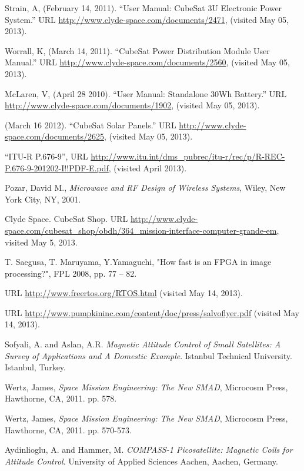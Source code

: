 \documentclass[12pt]{article}
\begin{document}
\begin{thebibliography}{9}
 Strain, A, (February 14, 2011).  ``User Manual: CubeSat 3U Electronic Power System.'' URL \url{http://www.clyde-space.com/documents/2471}, (visited May 05, 2013).

 Worrall, K, (March 14, 2011).  ``CubeSat Power Distribution Module User Manual.'' URL \url{http://www.clyde-space.com/documents/2560}, (visited May 05, 2013).

 McLaren, V, (April 28 2010).  ``User Manual: Standalone 30Wh Battery.''  URL \url{http://www.clyde-space.com/documents/1902}, (visited May 05, 2013).

 (March 16 2012). ``CubeSat Solar Panels.''  URL \url{http://www.clyde-space.com/documents/2625}, (visited May 05, 2013).


``ITU-R P.676-9'', URL \url{http://www.itu.int/dms_pubrec/itu-r/rec/p/R-REC-P.676-9-201202-I!!PDF-E.pdf}, (visited April 2013).

Pozar, David M., \emph{Microwave and RF Design of Wireless Systems}, Wiley, New York City, NY, 2001.



Clyde Space. CubeSat Shop. URL \url{http://www.clyde-space.com/cubesat_shop/obdh/364_mission-interface-computer-grande-em}, visited May 5, 2013. 

T. Saegusa, T. Maruyama, Y.Yamaguchi, "How fast is an FPGA in image processing?", FPL 2008, pp. 77 – 82.

URL \url{http://www.freertos.org/RTOS.html} (visited May 14, 2013).

URL \url{http://www.pumpkininc.com/content/doc/press/salvoflyer.pdf} (visited May 14, 2013).


Sofyali, A. and Aslan, A.R. \emph{Magnetic Attitude Control of Small Satellites: A Survey of Applications and A Domestic Example}. Istanbul Technical University. Istanbul, Turkey. 

Wertz, James, \emph{Space Mission Engineering: The New SMAD}, Microcosm Press, Hawthorne, CA, 2011. pp. 578. 

Wertz, James, \emph{Space Mission Engineering: The New SMAD}, Microcosm Press, Hawthorne, CA, 2011. pp. 570-573. 

Aydinlioglu, A. and Hammer, M. \emph{COMPASS-1 Picosatellite: Magnetic Coils for Attitude Control}. University of Applied Sciences Aachen, Aachen, Germany. 


\end{thebibliography}
\end{document}
